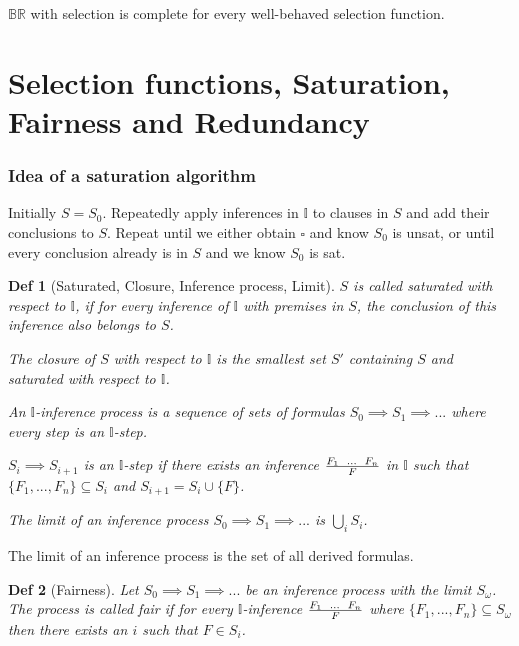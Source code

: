 \documentclass[]{article}
\newtheorem*{definition*}{Def}
\begin{document}
$\mathbb{BR}$ with selection is complete for every well-behaved selection function.

\section{Selection functions, Saturation, Fairness and Redundancy}

\subsubsection{Idea of a saturation algorithm}

Initially $S=S_0$. Repeatedly apply inferences in $\mathbb{I}$ to clauses in $S$ and add their conclusions to $S$. Repeat until we either obtain $\square$ and know $S_0$ is unsat, or until every conclusion already is in $S$ and we know $S_0$ is sat.

\begin{definition*}[Saturated, Closure, Inference process, Limit]
	$S$ is called saturated with respect to $\mathbb{I}$, if for every inference of $\mathbb{I}$ with premises in $S$, the conclusion of this inference also belongs to $S$.
	
	The closure of $S$ with respect to $\mathbb{I}$ is the smallest set $S'$ containing $S$ and saturated with respect to $\mathbb{I}$.
	
	An $\mathbb{I}$-inference process is a sequence of sets of formulas $S_0 \implies S_1 \implies ...$ where every step is an $\mathbb{I}$-step.
	
	$S_i \implies S_{i+1}$ is an $\mathbb{I}$-step if there exists an inference $\frac{F_1 \hspace{0.2cm} ... \hspace{0.2cm} F_n}{F}$ in $\mathbb{I}$ such that $\{F_1,...,F_n\} \subseteq S_i$ and $S_{i+1} = S_i \cup \{F\}$.
	
	The limit of an inference process $S_0 \implies S_1 \implies ...$ is $\bigcup_i S_i$.
\end{definition*}

The limit of an inference process is the set of all derived formulas.

\begin{definition*}[Fairness]
	Let $S_0 \implies S_1 \implies ...$ be an inference process with the limit $S_\omega$. The process is called fair if for every $\mathbb{I}$-inference $\frac{F_1 \hspace{0.2cm} ... \hspace{0.2cm} F_n}{F}$ where $\{F_1, ..., F_n\} \subseteq S_\omega$ then there exists an $i$ such that $F \in S_i$.
\end{definition*}
\end{document}
